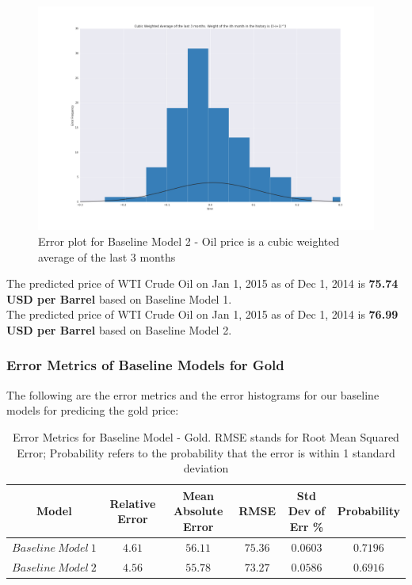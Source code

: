 \documentclass[runningheads]{llncs}
\begin{document}
\begin{figure}
\centering
\includegraphics[width=\textwidth]{BM2_Oil.png}
\caption{Error plot for Baseline Model 2 - Oil price is a cubic weighted average of the last 3 months}
\label{fig:BM2_Oil.png}
\end{figure}

\noindent The predicted price of WTI Crude Oil on Jan 1, 2015 as of Dec 1, 2014 is \textbf{75.74 USD per Barrel} based on Baseline Model 1.\\

\noindent The predicted price of WTI Crude Oil on Jan 1, 2015 as of Dec 1, 2014 is \textbf{76.99 USD per Barrel} based on Baseline Model 2.\\

\subsubsection {Error Metrics of Baseline Models for Gold} 
The following are the error metrics and the error histograms for our baseline models for predicing the gold price:

\begin{table}
\begin{center}
\begin{tabular}{|c|c|c|c|c|c}
\hline
Model & Relative Error & Mean Absolute Error & RMSE & Std Dev of Err \% & Probability \\ \hline
$ Baseline\ Model\ 1 $ & $4.61$ & $56.11$ & $75.36$ & $0.0603$ & $0.7196$ \\ \hline
$ Baseline\ Model\ 2 $ & $4.56$ & $55.78$ & $73.27$ & $0.0586$ & $0.6916$\\ \hline
\end{tabular}
\end{center} 
\caption{Error Metrics for Baseline Model - Gold. 
RMSE stands for Root Mean Squared Error; Probability refers to the probability that the error is within 1 standard deviation}
\end{table}
\end{document}
